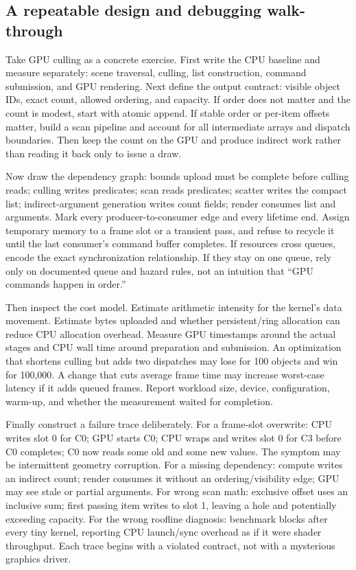 \subsection{A repeatable design and debugging walk-through}\label{a-repeatable-design-and-debugging-walk-through}

Take GPU culling as a concrete exercise. First write the CPU baseline and measure separately: scene traversal, culling, list construction, command submission, and GPU rendering. Next define the output contract: visible object IDs, exact count, allowed ordering, and capacity. If order does not matter and the count is modest, start with atomic append. If stable order or per-item offsets matter, build a scan pipeline and account for all intermediate arrays and dispatch boundaries. Then keep the count on the GPU and produce indirect work rather than reading it back only to issue a draw.

Now draw the dependency graph: bounds upload must be complete before culling reads; culling writes predicates; scan reads predicates; scatter writes the compact list; indirect-argument generation writes count fields; render consumes list and arguments. Mark every producer-to-consumer edge and every lifetime end. Assign temporary memory to a frame slot or a transient pass, and refuse to recycle it until the last consumer's command buffer completes. If resources cross queues, encode the exact synchronization relationship. If they stay on one queue, rely only on documented queue and hazard rules, not an intuition that ``GPU commands happen in order.''

Then inspect the cost model. Estimate arithmetic intensity for the kernel's data movement. Estimate bytes uploaded and whether persistent/ring allocation can reduce CPU allocation overhead. Measure GPU timestamps around the actual stages and CPU wall time around preparation and submission. An optimization that shortens culling but adds two dispatches may lose for 100 objects and win for 100,000. A change that cuts average frame time may increase worst-case latency if it adds queued frames. Report workload size, device, configuration, warm-up, and whether the measurement waited for completion.

Finally construct a failure trace deliberately. For a frame-slot overwrite: CPU writes slot 0 for C0; GPU starts C0; CPU wraps and writes slot 0 for C3 before C0 completes; C0 now reads some old and some new values. The symptom may be intermittent geometry corruption. For a missing dependency: compute writes an indirect count; render consumes it without an ordering/visibility edge; GPU may see stale or partial arguments. For wrong scan math: exclusive offset uses an inclusive sum; first passing item writes to slot 1, leaving a hole and potentially exceeding capacity. For the wrong roofline diagnosis: benchmark blocks after every tiny kernel, reporting CPU launch/sync overhead as if it were shader throughput. Each trace begins with a violated contract, not with a mysterious graphics driver.


